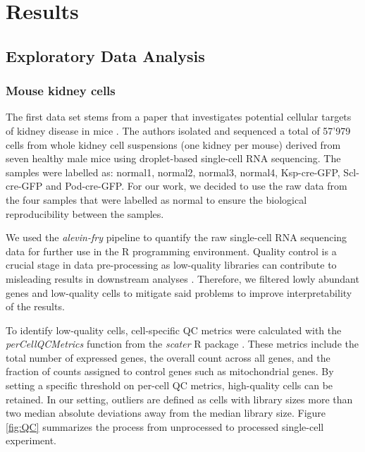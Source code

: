 

\chapter{Results}

\section{Exploratory Data Analysis}

\subsection{Mouse kidney cells}
The first data set stems from a paper that investigates potential cellular targets of kidney disease in mice \citep{mouse_cells}. The authors isolated and sequenced a total of 57'979 cells from whole kidney cell suspensions (one kidney per mouse) derived from seven healthy male mice using droplet-based single-cell RNA sequencing. The samples were labelled as: normal1, normal2, normal3, normal4, Ksp-cre-GFP, Scl-cre-GFP and Pod-cre-GFP. For our work, we decided to use the raw data from the four samples that were labelled as normal to ensure the biological reproducibility between the samples.

We used the \emph{alevin-fry} pipeline to quantify the raw single-cell RNA sequencing data for further use in the R programming environment. Quality control is a crucial stage in data pre-processing as low-quality libraries can contribute to misleading results in downstream analyses \citep{OSCA}. Therefore, we filtered lowly abundant genes and low-quality cells to mitigate said problems to improve interpretability of the results. 

To identify low-quality cells, cell-specific QC metrics were calculated with the \emph{perCellQCMetrics} function from the \emph{scater} R package \citep{scater}. These metrics include the total number of expressed genes, the overall count across all genes, and the fraction of counts assigned to control genes such as mitochondrial genes. By setting a specific threshold on per-cell QC metrics, high-quality cells can be retained. In our setting, outliers are defined as cells with library sizes more than two median absolute deviations away from the median library size. Figure \ref{fig:QC} summarizes the process from unprocessed to processed single-cell experiment. 

